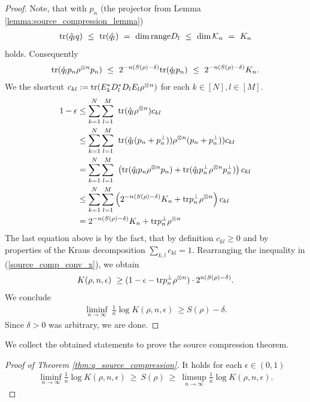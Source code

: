\begin{proof}
 Note, that with $p_n$ (the projector from Lemma \ref{lemma:source_compression_lemma})
 \begin{align*}
  \mathrm{tr}(\hat{q}_l q) \ \leq \ \mathrm{tr}(\hat{q_l}) \ =  \ \dim \textrm{range} D_l \ \leq \ \dim {\mathcal K}_n \ = \ K_n
 \end{align*}
 holds. Consequently
 \begin{align*}
  \tr(\hat{q}_l p_n \rho^{\otimes n} p_n) \
   \leq  \ 2^{-n(S(\rho)-  \delta)} \tr(\hat{q}_l p_n) \ 
   \leq \ 2^{-n(S(\rho)-  \delta)} K_n.
 \end{align*}
  We the shortcut $c_{kl} := \mathrm{tr}(E_k^\ast D_l^\ast D_l E_l \rho^{\otimes n})$ for each $k \in [N], l \in [M]$.
  \begin{align}
   1 - \epsilon 
   & \leq \sum_{k=1}^N \sum_{l=1}^M \ \mathrm{tr}(\hat{q}_l \rho^{\otimes n}) c_{kl}  \nonumber \\
   & \leq \sum_{k=1}^N \sum_{l=1}^M \ \mathrm{tr}(\hat{q}_l (p_n + p_n^\perp) ) \rho^{\otimes n} (p_n + p_n^\perp) ) c_{kl} \nonumber \\
   & = \sum_{k=1}^N \sum_{l=1}^M \ \left(\mathrm{tr}(\hat{q}_l p_n \rho^{\otimes n} p_n) + \mathrm{tr}(\hat{q}_l p_n^\perp
	  \rho^{\otimes n}p_n^{\perp})  \right) c_{kl} \nonumber \\
   & \leq \sum_{k=1}^N \sum_{l=1}^M \left(2^{-n(S(\rho)- \delta)} K_n + 
   \mathrm{tr} p_n^\perp\rho^{\otimes n}\right)  c_{kl} \nonumber  \\
   &= 2^{-n(S(\rho)- \delta)} K_n + \mathrm{tr} p_n^\perp\rho^{\otimes n} \label{source_comp_conv_x}
  \end{align}
  The last equation above is by the fact, that by definition $c_{kl} \geq 0$ and by properties of the Kraus decomposition $\sum_{k,l} c_{kl} = 1$. 
  Rearranging the inequality in (\ref{source_comp_conv_x}), we obtain
   \begin{align*}
   K(\rho,n, \epsilon) \ \geq (1 - \epsilon -  \mathrm{tr} p_n^{\perp}\rho^{\otimes n}) \cdot 2^{n(S(\rho)- \delta)}.
  \end{align*}
  We conclude 
  \begin{align*}
   \liminf_{n \rightarrow \infty} \ \tfrac{1}{n} \log K(\rho,n, \epsilon) \ \geq S(\rho) - \delta. 
  \end{align*}
  Since $\delta > 0$ was arbitrary, we are done.
  \end{proof}
  We collect the obtained statements to prove the source compression theorem. 
  \begin{proof}[Proof of Theorem \ref{thm:q_source_compression}]
   It holds for each $\epsilon \in (0,1)$
   \begin{align*}
    \liminf_{n \rightarrow \infty} \tfrac{1}{n} \log K(\rho, n, \epsilon) 
    \ \geq \ S(\rho) \ \geq  \ 
    \limsup_{n \rightarrow \infty} \tfrac{1}{n} \log K(\rho, n, \epsilon).
   \end{align*}
  \end{proof}

